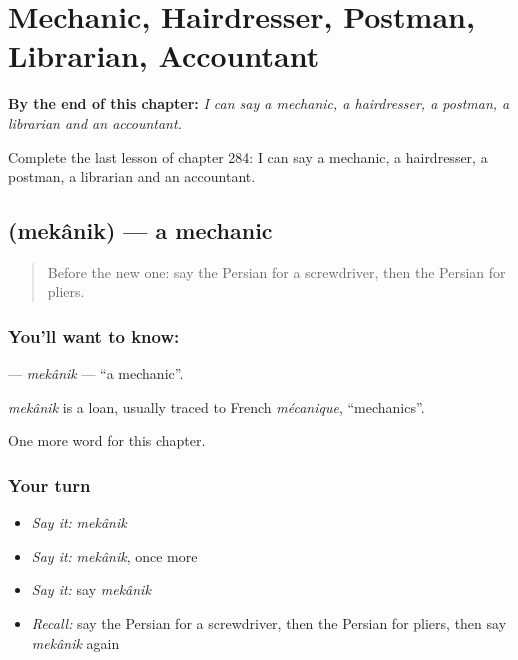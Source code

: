 
\chapter{Mechanic, Hairdresser, Postman, Librarian, Accountant}
\label{ch:fa-mechanic-hairdresser-postman-librarian-accountant}

\begin{chapteropening}
\textbf{By the end of this chapter:} \emph{I can say a mechanic, a hairdresser, a postman, a librarian and an accountant.}

Complete the last lesson of chapter 284: I can say a mechanic, a hairdresser, a postman, a librarian and an accountant.
\end{chapteropening}

\section[\texorpdfstring{\fa{مکانیک} (mekânik)}{مکانیک (mekânik)}]{ (mekânik) — a mechanic}

\label{lesson:FA-C284-mekanik}



\begin{quote}
Before the new one: say the Persian for a screwdriver, then the Persian for pliers.
\end{quote}

\subsection*{You'll want to know: }
\textbf{} — \emph{mekânik} — \textquotedblleft{}a mechanic\textquotedblright{}.

\begin{cousinweb}
\emph{mekânik} is a loan, usually traced to French \emph{mécanique}, \textquotedblleft{}mechanics\textquotedblright{}.
\end{cousinweb}

\begin{grammarlens}[title={What you've built}]
One more word for this chapter.
\end{grammarlens}

\subsection*{Your turn}
\begin{itemize}
\raggedright
  \item \emph{Say it:} \emph{mekânik}
  \item \emph{Say it:} \emph{mekânik}, once more
  \item \emph{Say it:} say \emph{mekânik}
  \item \emph{Recall:} say the Persian for a screwdriver, then the Persian for pliers, then say \emph{mekânik} again
\end{itemize}

